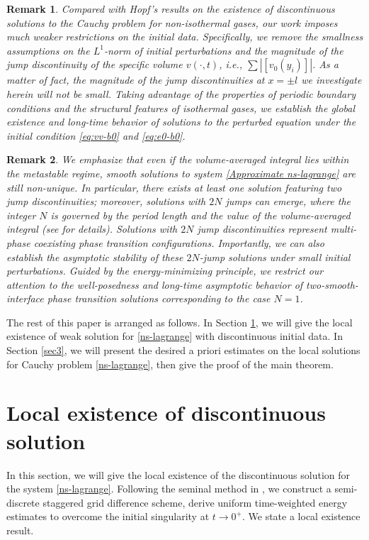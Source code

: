 \documentclass[a4paper,oneside,11pt]{article}
\numberwithin{equation}{section}
\newtheorem{remark}{Remark}[section]
\begin{document}
\begin{remark}
Compared with Hopf’s results \cite{hoff1991,hoff1992} on the existence of discontinuous solutions to the Cauchy problem for non-isothermal gases, our work imposes much weaker restrictions on the initial data. Specifically, we remove the smallness assumptions on the \(L^1\)-norm of initial perturbations and the magnitude of the jump discontinuity of the specific volume $v(\cdot, t)$, i.e., $\sum|[v_0(y_i)]|$. As a matter of fact, the magnitude of the jump discontinuities at $x=\pm l$ we investigate herein will not be small.
Taking advantage of the properties of periodic boundary conditions and the structural features of isothermal gases, we establish the global existence and long-time behavior of solutions to the perturbed equation under the initial condition \eqref{eq:vv-b0} and \eqref{eq:e0-b0}.
\end{remark}

\begin{remark}
We emphasize that even if the volume-averaged integral lies within the metastable regime, smooth solutions to system \eqref{Approximate ns-lagrange} are still non-unique. In particular, there exists at least one solution featuring two jump discontinuities; moreover, solutions with $2N$ jumps can emerge, where the integer $N$ is governed by the period length and the value of the volume-averaged integral (see \cite{chnys2026} for details). Solutions with $2N$ jump discontinuities represent multi-phase coexisting phase transition configurations. Importantly, we can also establish the asymptotic stability of these $2N$-jump solutions under small initial perturbations. Guided by the energy-minimizing principle, we restrict our attention to the well-posedness and long-time asymptotic behavior of two-smooth-interface phase transition solutions corresponding to the case $N=1$. 
\end{remark}
   
The rest of this paper is arranged as follows. In Section \ref{sec:local}, we will give the local existence of weak solution for   \eqref{ns-lagrange} with discontinuous initial data.  In Section \ref{sec3},  we will present the desired a priori estimates on the local solutions for Cauchy problem \eqref{ns-lagrange},  then give the proof of the main theorem.
   


\section{Local existence of discontinuous solution}\label{sec:local}
\indent\qquad
In this section, we will give the local existence of the discontinuous solution for the system  \eqref{ns-lagrange}.
Following the seminal method in \cite{hoff1991}, we construct a semi-discrete staggered grid difference scheme, derive uniform time-weighted energy estimates to overcome the initial singularity at \(t\to0^+\).
We state a local existence result.
\end{document}
